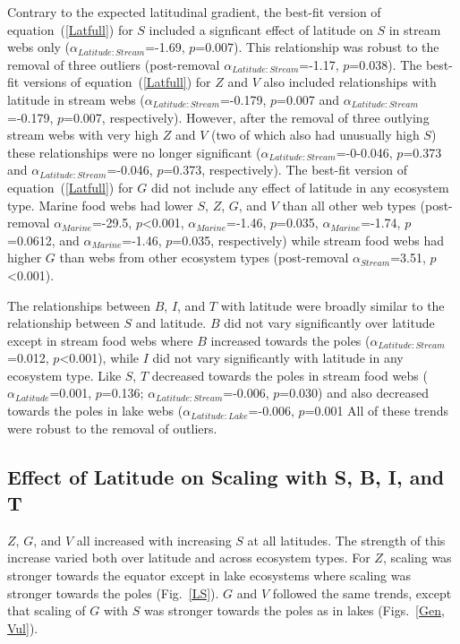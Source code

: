 \documentclass[12pt]{article}
\begin{document}
  Contrary to the expected latitudinal gradient, the best-fit version of
  equation~(\ref{Latfull}) for $S$ included a signficant effect of latitude on $S$
  in stream webs only ($\alpha_{Latitude:Stream}$=-1.69, $p$=0.007).  This
  relationship was robust to the removal of three outliers (post-removal
  $\alpha_{Latitude:Stream}$=-1.17, $p$=0.038). The best-fit versions of
  equation~(\ref{Latfull}) for $Z$ and $V$ also included relationships with
  latitude in stream webs ($\alpha_{Latitude:Stream}$=-0.179, $p$=0.007 and
  $\alpha_{Latitude:Stream}$=-0.179, $p$=0.007, respectively). However, after
  the removal of three outlying stream webs with very high $Z$ and $V$ (two of
  which also had unusually high $S$) these relationships were no longer
  significant ($\alpha_{Latitude:Stream}$=-0-0.046, $p$=0.373 and
  $\alpha_{Latitude:Stream}$=-0.046, $p$=0.373, respectively). The best-fit
  version of equation~(\ref{Latfull}) for $G$ did not include any effect of
  latitude in any ecosystem type. Marine food webs
  had lower $S$, $Z$, $G$, and $V$ than all other web types (post-removal
  $\alpha_{Marine}$=-29.5, $p$\textless0.001, $\alpha_{Marine}$=-1.46,
  $p$=0.035, $\alpha_{Marine}$=-1.74, $p$=0.0612, and $\alpha_{Marine}$=-1.46,
  $p$=0.035, respectively) while stream food webs had higher $G$ than webs from
  other ecosystem types (post-removal $\alpha_{Stream}$=3.51,
  $p$\textless0.001).


  The relationships between $B$, $I$, and $T$ with latitude were broadly similar
  to the relationship between $S$ and latitude. $B$ did not vary significantly
  over latitude except in stream food webs where $B$ increased towards the poles
  ($\alpha_{Latitude:Stream}$=0.012, $p$\textless0.001), while $I$ did not vary
  significantly with latitude in any ecosystem type. Like $S$, $T$ decreased
  towards the poles in stream food webs ($\alpha_{Latitude}$=0.001, $p$=0.136;
  $\alpha_{Latitude:Stream}$=-0.006, $p$=0.030) and also decreased towards the
  poles in lake webs ($\alpha_{Latitude:Lake}$=-0.006, $p$=0.001
  All of these trends were robust to the removal of outliers.


\subsection*{Effect of Latitude on Scaling with S, B, I, and T}

$Z$, $G$, and $V$ all increased with increasing $S$ at all latitudes. The strength of
this increase varied both over latitude and across ecosystem types. For $Z$,
scaling was stronger towards the equator except in lake ecosystems where scaling was stronger
towards the poles (Fig.~\ref{LS}). $G$ and $V$ followed the same trends, except that scaling of $G$
with $S$ was stronger towards the poles as in lakes (Figs.~\ref{Gen, Vul}).
\end{document}

